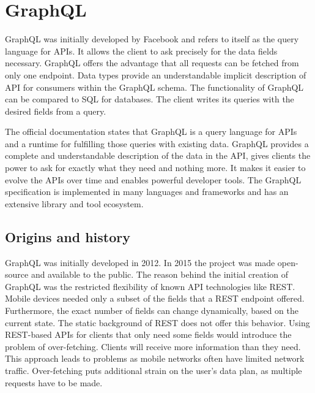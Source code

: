 \section{GraphQL}\label{section:background:graphql}

GraphQL was initially developed by Facebook and refers to itself as the query language for \acp{API}. It allows the client to ask precisely for the data fields necessary. GraphQL offers the advantage that all requests can be fetched from only one endpoint. Data types provide an understandable implicit description of \ac{API} for consumers within the GraphQL schema. \cite{misc:-:background:graphql:graphql-org} The functionality of GraphQL can be compared to \ac{SQL} for databases. The client writes its queries with the desired fields from a query.

\bigskip

\noindent The official documentation states that GraphQL is a query language for \acp{API} and a runtime for fulfilling those queries with existing data. GraphQL provides a complete and understandable description of the data in the \ac{API}, gives clients the power to ask for exactly what they need and nothing more. It makes it easier to evolve the \acp{API} over time and enables powerful developer tools. The GraphQL specification is implemented in many languages and frameworks and has an extensive library and tool ecosystem.

\subsection{Origins and history}\label{subsection:background:graphql:origins-and-history}

GraphQL was initially developed in 2012. In 2015 the project was made open-source and available to the public. The reason behind the initial creation of GraphQL was the restricted flexibility of known \ac{API} technologies like \ac{REST}. Mobile devices needed only a subset of the fields that a \ac{REST} endpoint offered. Furthermore, the exact number of fields can change dynamically, based on the current state. The static background of \ac{REST} does not offer this behavior. Using \ac{REST}-based \acp{API} for clients that only need some fields would introduce the problem of over-fetching. Clients will receive more information than they need. This approach leads to problems as mobile networks often have limited network traffic. Over-fetching puts additional strain on the user's data plan, as multiple requests have to be made. \cite{misc:2015:bryon:background:graphql:graphql-query-language}

